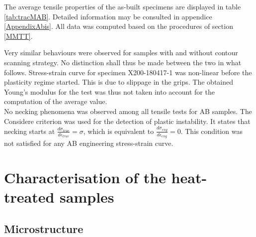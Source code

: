 The average tensile properties of the as-built specimens are displayed in table \ref{tab:tracMAB}. Detailed information may be consulted in appendice \ref{AppendixAbis}. All data was computed based on the procedures of section \ref{MMTT}.\\

 \begin{center}
\begin{table}[ht]
\noindent{}

\caption[Average tensile mechanical properties of the as-built specimens from batch X200-180417]{Average tensile mechanical properties of the as-built specimens from batch X200-180417}
\label{tab:tracMAB}
\end{table}
 \end{center}
 
Very similar behaviours were observed for samples with and without contour scanning strategy. No distinction shall thus be made between the two in what follows. Stress-strain curve for specimen X200-180417-1 was non-linear before the plasticity regime started. This is due to slippage in the grips. The obtained Young's modulus for the test was thus not taken into account for the computation of the average value.\\

No necking phenomena was observed among all tensile tests for AB samples. The Considere criterion was used for the detection of plastic instability. It states that necking starts at $\frac{d\sigma_{true}}{d\epsilon_{true}}=\sigma$, which is equivalent to $\frac{d\sigma_{eng}}{d\epsilon_{eng}}=0$. This condition was not satisfied for any AB engineering stress-strain curve.\\
 
\section{Characterisation of the heat-treated samples}
\label{RCHTS}
\subsection{Microstructure}

